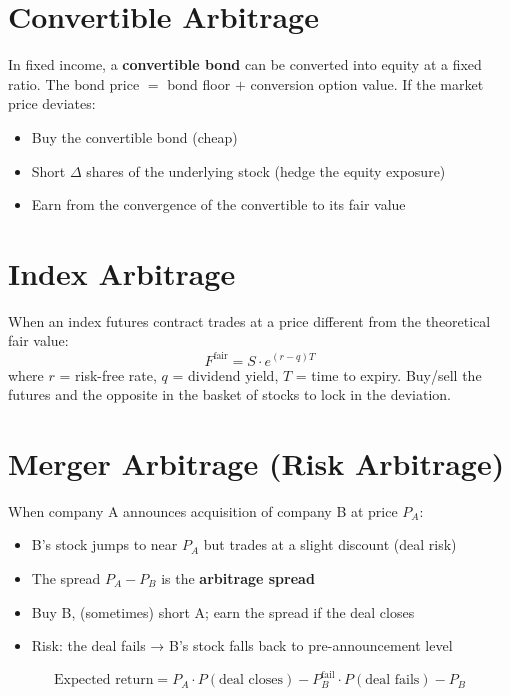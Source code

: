 \documentclass[12pt,a4paper,openany]{report}
\theoremstyle{definition}
\begin{document}
\section{Convertible Arbitrage}

In fixed income, a \textbf{convertible bond} can be converted into equity at a fixed ratio. The bond price $= $ bond floor $+$ conversion option value. If the market price deviates:
\begin{itemize}
  \item Buy the convertible bond (cheap)
  \item Short $\Delta$ shares of the underlying stock (hedge the equity exposure)
  \item Earn from the convergence of the convertible to its fair value
\end{itemize}

\section{Index Arbitrage}

When an index futures contract trades at a price different from the theoretical fair value:
\[
  F^{\text{fair}} = S \cdot e^{(r - q)T}
\]
where $r$ = risk-free rate, $q$ = dividend yield, $T$ = time to expiry. Buy/sell the futures and the opposite in the basket of stocks to lock in the deviation.

\section{Merger Arbitrage (Risk Arbitrage)}

When company A announces acquisition of company B at price $P_A$:
\begin{itemize}
  \item B's stock jumps to near $P_A$ but trades at a slight discount (deal risk)
  \item The spread $P_A - P_B$ is the \textbf{arbitrage spread}
  \item Buy B, (sometimes) short A; earn the spread if the deal closes
  \item Risk: the deal fails → B's stock falls back to pre-announcement level
\end{itemize}

\begin{equation}
  \text{Expected return} = P_A \cdot P(\text{deal closes}) - P_B^{\text{fail}} \cdot P(\text{deal fails}) - P_B
\end{equation}
\end{document}
